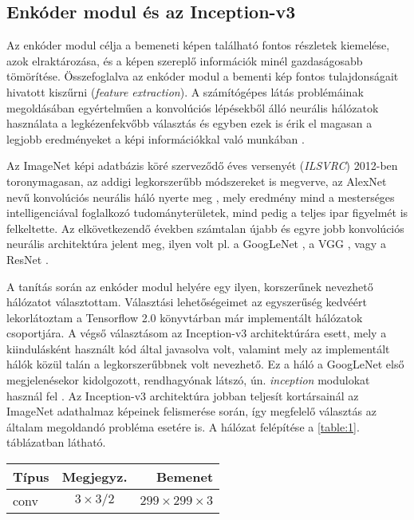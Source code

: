 \begin{multicols}{2}
\subsection{Enkóder modul és az Inception-v3}
Az enkóder modul célja a bemeneti képen található fontos részletek kiemelése, azok elraktározása, és a képen szereplő információk minél gazdaságosabb tömörítése. Összefoglalva az enkóder modul a bementi kép fontos tulajdonságait hivatott kiszűrni (\emph{feature extraction}). A számítógépes látás problémáinak megoldásában egyértelműen a konvolúciós lépésekből álló neurális hálózatok használata a legkézenfekvőbb választás és egyben ezek is érik el magasan a legjobb eredményeket a képi információkkal való munkában \citep{khan2018guide}. \par
Az ImageNet képi adatbázis köré szerveződő éves versenyét (\emph{ILSVRC}) \citep{2014arXiv1409.0575R} 2012-ben toronymagasan, az addigi legkorszerűbb módszereket is megverve, az AlexNet nevű konvolúciós neurális háló nyerte meg \citep{krizhevsky2012imagenet}, mely eredmény mind a mesterséges intelligenciával foglalkozó tudományterületek, mind pedig a teljes ipar figyelmét is felkeltette. Az elkövetkezendő években számtalan újabb és egyre jobb konvolúciós neurális architektúra jelent meg, ilyen volt pl. a GoogLeNet \citep{2014arXiv1409.4842S}, a VGG \citep{2014arXiv1409.1556S}, vagy a ResNet \citep{2015arXiv151203385H}. \par
A tanítás során az enkóder modul helyére egy ilyen, korszerűnek nevezhető hálózatot választottam. Választási lehetőségeimet az egyszerűség kedvéért lekorlátoztam a Tensorflow 2.0 könyvtárban már implementált hálózatok csoportjára. A végső választásom az Inception-v3 architektúrára esett, mely a kiindulásként használt kód által javasolva volt, valamint mely az implementált hálók közül talán a legkorszerűbbnek volt nevezhető. Ez a háló a GoogLeNet első megjelenésekor kidolgozott, rendhagyónak látszó, ún. \emph{inception} modulokat használ fel \citep{2015arXiv151200567S}. Az Inception-v3 architektúra jobban teljesít kortársainál az ImageNet adathalmaz képeinek felismerése során, így megfelelő választás az általam megoldandó probléma esetére is. A hálózat felépítése a \ref{table:1}. táblázatban látható.
\begin{center}
\footnotesize
\begin{tabular}{|l|c|r|}
\hline
\textbf{Típus}       & \textbf{Megjegyz.}                      & \textbf{Bemenet}           \\
\hline \hline
conv                 & $3 \times 3 / 2$                        & $299 \times 299 \times 3$  \\ \hline

\end{tabular}
\end{center}
\end{multicols}
